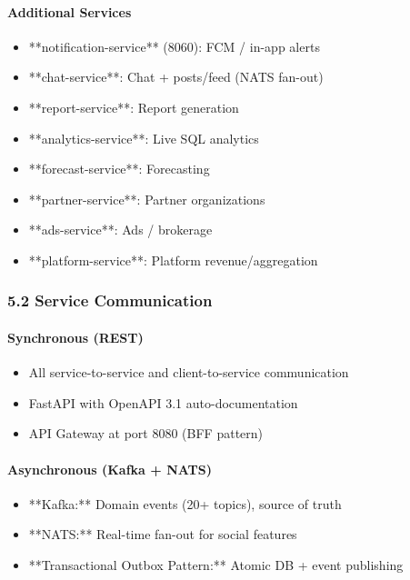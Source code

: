 \documentclass[11pt,a4paper]{article}
\begin{document}
\paragraph{Additional Services}

\begin{itemize}
\item **notification-service** (8060): FCM / in-app alerts
\item **chat-service**: Chat + posts/feed (NATS fan-out)
\item **report-service**: Report generation
\item **analytics-service**: Live SQL analytics
\item **forecast-service**: Forecasting
\item **partner-service**: Partner organizations
\item **ads-service**: Ads / brokerage
\item **platform-service**: Platform revenue/aggregation
\end{itemize}

\subsubsection{5.2 Service Communication}

\paragraph{Synchronous (REST)}

\begin{itemize}
\item All service-to-service and client-to-service communication
\item FastAPI with OpenAPI 3.1 auto-documentation
\item API Gateway at port 8080 (BFF pattern)
\end{itemize}

\paragraph{Asynchronous (Kafka + NATS)}

\begin{itemize}
\item **Kafka:** Domain events (20+ topics), source of truth
\item **NATS:** Real-time fan-out for social features
\item **Transactional Outbox Pattern:** Atomic DB + event publishing
\end{itemize}
\end{document}
